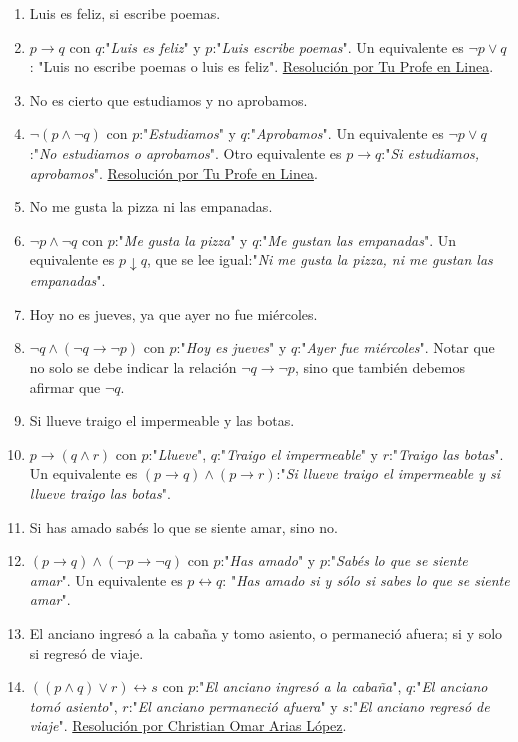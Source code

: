 \documentclass[a4paper]{article}
\newcommand{\answer}{\item[**]}
\newcommand{\then}{\to}
\newcommand{\eq}{\leftrightarrow}
\begin{document}
\begin{enumerate}[resume]
\begin{multicols}{2}
\begin{enumerate} [label=(\alph*)]
		\item Luis es feliz, si escribe poemas.
		\answer $p \then q$ con $q$:"\textit{Luis es feliz}" y $p$:"\textit{Luis escribe poemas}". Un equivalente es $\neg p \lor q$: "Luis no escribe poemas o luis es feliz". \href{https://youtu.be/HXzyX5XGPp8?t=374}{Resolución por Tu Profe en Linea}.

		\item No es cierto que estudiamos y no aprobamos.
		\answer $\neg (p \land \neg q)$ con $p$:"\textit{Estudiamos}" y $q$:"\textit{Aprobamos}". Un equivalente es $\neg p \lor q$:"\textit{No estudiamos o aprobamos}". Otro equivalente es $p \then q$:"\textit{Si estudiamos, aprobamos}". \href{https://youtu.be/HXzyX5XGPp8}{Resolución por Tu Profe en Linea}.

		\item No me gusta la pizza ni las empanadas. 
		\answer $\neg p  \land  \neg q$ con $p$:"\textit{Me gusta la pizza}" y $q$:"\textit{Me gustan las empanadas}". Un equivalente es $p \downarrow  q$, que se lee igual:"\textit{Ni me gusta la pizza, ni me gustan las empanadas}".

		\item Hoy no es jueves, ya que ayer no fue miércoles.
		\answer $\neg q \land (\neg q\then \neg p)$ con $p$:"\textit{Hoy es jueves}" y $q$:"\textit{Ayer fue miércoles}". Notar que no solo se debe indicar la relación $\neg q\then \neg p$, sino que también debemos afirmar que $\neg q$.

		\item Si llueve traigo el impermeable y las botas. 
		\answer $p \then  ( q  \land  r )$ con $p$:"\textit{Llueve}", $q$:"\textit{Traigo el impermeable}" y $r$:"\textit{Traigo las botas}". Un equivalente es $(p \then q) \land (p \then r )$:"\textit{Si llueve traigo el impermeable y si llueve traigo las botas}".

		\item Si has amado sabés lo que se siente amar, sino no. 
		\answer $( p \then  q )  \land  ( \neg p \then  \neg q )$ con $p$:"\textit{Has amado}" y $p$:"\textit{Sabés lo que se siente amar}". Un equivalente es $p \eq  q$: "\textit{Has amado si y sólo si sabes lo que se siente amar}".

		\item El anciano ingresó a la cabaña y tomo asiento, o permaneció afuera; si y solo si regresó de viaje.
		\answer $((p \land q) \lor r) \eq s$ con $p$:"\textit{El anciano ingresó a la cabaña}", $q$:"\textit{El anciano tomó asiento}", $r$:"\textit{El anciano permaneció afuera}" y $s$:"\textit{El anciano regresó de viaje}". \href{https://youtu.be/TgwraosKUuY?t=331}{Resolución por Christian Omar Arias López}.


\end{enumerate}
\end{multicols}
\end{enumerate}
\end{document}
